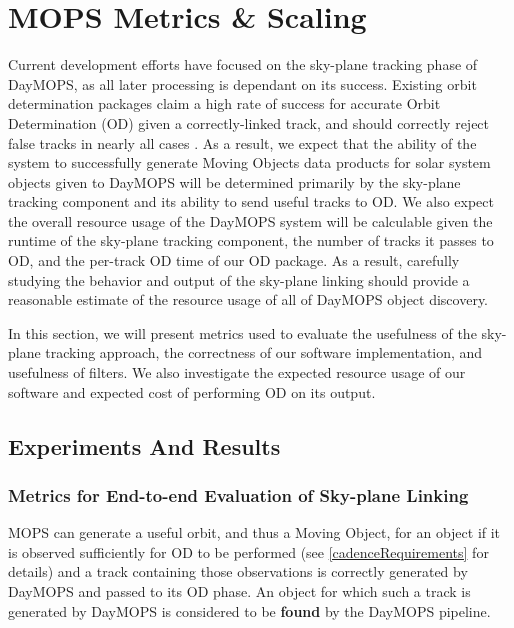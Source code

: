 \documentclass[12pt,preprint]{aastex}
\begin{document}
\section{MOPS Metrics \& Scaling}

Current development efforts have focused on the sky-plane tracking
phase of DayMOPS, as all later processing is dependant on its
success. Existing orbit determination packages claim a high rate of
success for accurate Orbit Determination (OD) given a correctly-linked
track, and should correctly reject false tracks in nearly all cases
\citep{Milani2006}. As a result, we expect that the ability of the
system to successfully generate Moving Objects data products for solar
system objects given to DayMOPS will be determined primarily by the
sky-plane tracking component and its ability to send useful tracks to
OD.  We also expect the overall resource usage of the DayMOPS system
will be calculable given the runtime of the sky-plane tracking
component, the number of tracks it passes to OD, and the per-track OD
time of our OD package.  As a result, carefully studying the behavior
and output of the sky-plane linking should provide a reasonable
estimate of the resource usage of all of DayMOPS object discovery.


In this section, we will present metrics used to evaluate the
usefulness of the sky-plane tracking approach, the correctness of our
software implementation, and usefulness of filters. We also
investigate the expected resource usage of our software and expected cost
of performing OD on its output.



\subsection{Experiments And Results}

\subsubsection{Metrics for End-to-end Evaluation of Sky-plane Linking}
MOPS can generate a useful orbit, and thus a Moving Object, for an
object if it is observed sufficiently for OD to be performed (see
\ref{cadenceRequirements} for details) and a track containing those
observations is correctly generated by DayMOPS and passed to its OD
phase.  An object for which such a track is generated by DayMOPS is
considered to be \textbf{found} by the DayMOPS pipeline.  
\end{document}
